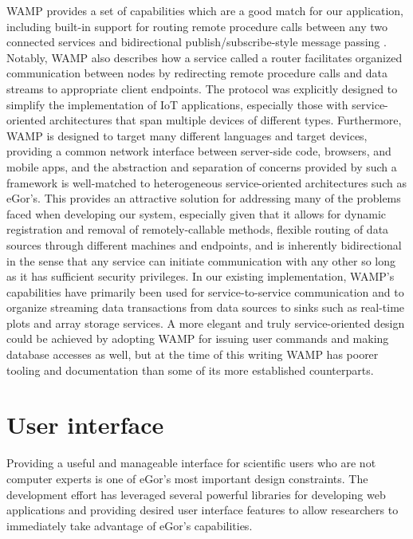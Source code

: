 \documentclass[../thesis]{subfiles}
\begin{document}
\gls{WAMP} provides a set of capabilities which are a good match for
our application, including built-in support for routing remote
procedure calls between any two connected services and bidirectional
publish/subscribe-style message passing \cite{WAMP}. Notably,
\gls{WAMP} also describes how a service called a router facilitates
organized communication between nodes by redirecting remote procedure
calls and data streams to appropriate client endpoints. The protocol was
explicitly designed to simplify the implementation of \gls{IoT}
applications, especially those with service-oriented architectures
that span multiple devices of different types. Furthermore, \gls{WAMP} is
designed to target many different languages and target devices,
providing a common network interface between server-side code,
browsers, and mobile apps, and the abstraction and separation of
concerns provided by such a framework is well-matched to heterogeneous
service-oriented architectures such as eGor's. This provides an
attractive solution for addressing many of the problems faced when
developing our system, especially given that it allows for dynamic
registration and removal of remotely-callable methods, flexible
routing of data sources through different machines and endpoints, and
is inherently bidirectional in the sense that any service can initiate
communication with any other so long as it has sufficient security
privileges. In our existing implementation, \gls{WAMP}'s capabilities
have primarily been used for service-to-service communication and to
organize streaming data transactions from data sources to sinks such
as real-time plots and array storage services. A more elegant and
truly service-oriented design could be achieved by adopting \gls{WAMP}
for issuing user commands and making database accesses as well, but at
the time of this writing \gls{WAMP} has poorer tooling and
documentation than some of its more established counterparts.



\section{User interface}
Providing a useful and manageable interface for scientific users who
are not computer experts is one of eGor's most important design
constraints. The development effort has leveraged several powerful
libraries for developing web applications and providing desired user
interface features to allow researchers to immediately take advantage
of eGor's capabilities.
\end{document}
